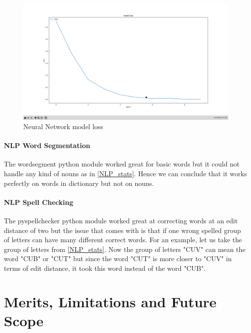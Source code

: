 \documentclass[12pt,a4paper]{report}
\begin{document}
\begin{figure}[htbp]
	\centerline{\includegraphics[scale=0.15]{neural_network_loss.png}}
	\caption{Neural Network model loss}
	\label{Neural_net_loss}
\end{figure}

\subsubsection{NLP Word Segmentation}
The wordsegment python module worked great for basic words but it could not handle any kind of nouns as in \ref{NLP_stats}. Hence we can conclude that it works perfectly on words in dictionary but not on nouns.

\subsubsection{NLP Spell Checking}
The pyspellchecker python module worked great at correcting words at an edit distance of two but the issue that comes with is that if one wrong spelled group of letters can have many different correct words. For an example, let us take the group of letters from \ref{NLP_stats}. Now the group of letters "CUV" can mean the word "CUB" or "CUT" but since the word "CUT" is more closer to "CUV" in terms of edit distance, it took this word instead of the word "CUB".

\chapter{Merits, Limitations and Future Scope}
\end{document}
